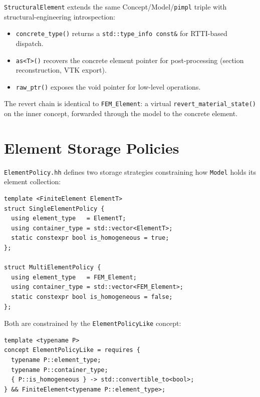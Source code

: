 \texttt{StructuralElement} extends the same Concept/Model/\texttt{pimpl}
triple with structural-engineering introspection:

\begin{itemize}
  \item \texttt{concrete\_type()} returns a
        \texttt{std::type\_info const\&} for RTTI-based dispatch.
  \item \texttt{as<T>()} recovers the concrete element pointer for
        post-processing (section reconstruction, VTK export).
  \item \texttt{raw\_ptr()} exposes the void pointer for low-level
        operations.
\end{itemize}

The revert chain is identical to \texttt{FEM\_Element}: a virtual
\texttt{revert\_material\_state()} on the inner concept, forwarded
through the model to the concrete element.

\section{Element Storage Policies}
\label{sec:element-policies}

\texttt{ElementPolicy.hh} defines two storage strategies constraining
how \texttt{Model} holds its element collection:

\begin{lstlisting}[caption={Element storage policies},
                   label={lst:element-policies}]
template <FiniteElement ElementT>
struct SingleElementPolicy {
  using element_type   = ElementT;
  using container_type = std::vector<ElementT>;
  static constexpr bool is_homogeneous = true;
};

struct MultiElementPolicy {
  using element_type   = FEM_Element;
  using container_type = std::vector<FEM_Element>;
  static constexpr bool is_homogeneous = false;
};
\end{lstlisting}

Both are constrained by the \texttt{ElementPolicyLike} concept:

\begin{lstlisting}
template <typename P>
concept ElementPolicyLike = requires {
  typename P::element_type;
  typename P::container_type;
  { P::is_homogeneous } -> std::convertible_to<bool>;
} && FiniteElement<typename P::element_type>;
\end{lstlisting}

